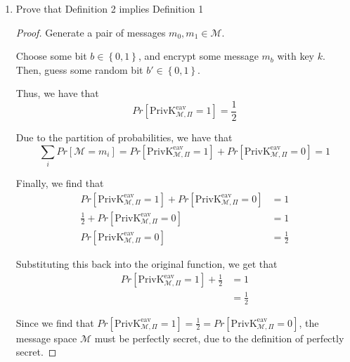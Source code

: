 \documentclass{article}
\begin{document}
\begin{enumerate}
\begin{enumerate}
      \item Prove that Definition 2 implies Definition 1
        
        \begin{proof}
          Generate a pair of messages $m_0, m_1 \in \mathcal{M}$.

          Choose some bit $b \in \left\{0, 1\right\}$, and encrypt some message
          $m_b$ with key $k$. Then, guess some random bit 
          $b' \in \left\{0, 1\right\}$.

          Thus, we have that
          \[
            Pr[\text{PrivK}_{\mathcal{M}, \Pi}^{\text{eav}} = 1] = \frac{1}{2}
          \]

          Due to the partition of probabilities, we have that
          \[
            \sum\limits_i Pr[\mathcal{M} = m_i] =  
            Pr[\text{PrivK}_{\mathcal{M}, \Pi}^{\text{eav}} = 1] + 
            Pr[\text{PrivK}_{\mathcal{M}, \Pi}^{\text{eav}} = 0] = 1
          \]

          Finally, we find that
          \begin{align*}
            Pr[\text{PrivK}_{\mathcal{M}, \Pi}^{\text{eav}} = 1] + 
            Pr[\text{PrivK}_{\mathcal{M}, \Pi}^{\text{eav}} = 0] &= 1\\
            \frac{1}{2} + Pr[\text{PrivK}_{\mathcal{M}, \Pi}^{\text{eav}} = 0] &= 1\\
            Pr[\text{PrivK}_{\mathcal{M}, \Pi}^{\text{eav}} = 0] &= \frac{1}{2}
          \end{align*}

          Substituting this back into the original function, we get that
          \begin{align*}
            Pr[\text{PrivK}_{\mathcal{M}, \Pi}^{\text{eav}} = 1] 
            + \frac{1}{2} &= 1\\
                          &= \frac{1}{2}
          \end{align*}

          Since we find that $Pr[\text{PrivK}_{\mathcal{M}, \Pi}^{\text{eav}} =
          1] = \frac{1}{2} = Pr[\text{PrivK}_{\mathcal{M}, \Pi}^{\text{eav}} =
          0]$, the message space $\mathcal{M}$ must be perfectly secret, due to
          the definition of perfectly secret.
        \end{proof}
    \end{enumerate}
\end{enumerate}
\end{document}
